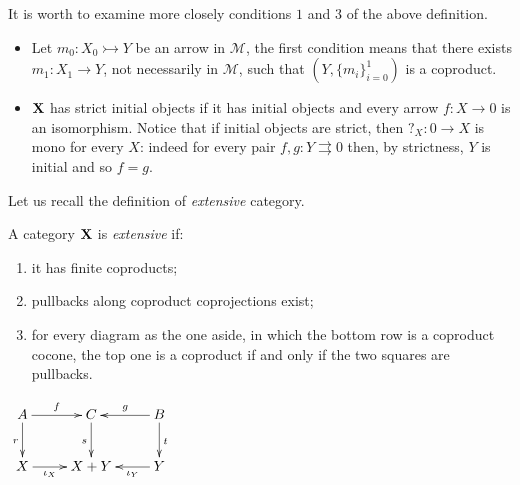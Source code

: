 \documentclass[a4paper,UKenglish,cleveref,pdftex, thm-restate,numberwithinsect]{lipics}
\def\X{\textbf {\textup{X}}}
\begin{document}
\begin{remark}
It is worth to examine more closely conditions $1$ and $3$ of the above definition.
\begin{itemize}
	\item Let $m_0\colon X_0 \rightarrowtail Y$ be an arrow in $\mathcal{M}$, the first condition means that there exists $m_1\colon X_1\to Y$, not necessarily in $\mathcal{M}$, such that $(Y, \{m_i\}_{i=0}^1)$ is a coproduct.
	\item $\X$ has strict initial objects if it has initial objects and every arrow $f:X\to 0$ is an isomorphism. Notice that if initial objects are strict, then $?_X\colon 0\to X$ is mono for every $X$: indeed for every pair $f,g\colon Y\rightrightarrows 0$ then, by strictness, $Y$ is initial and so $f=g$.
\end{itemize} 
\end{remark}

\begin{example}
\end{example}

\begin{example}
\end{example}

Let us recall the definition of \emph{extensive} category.

\noindent
\parbox{10cm}{
\begin{definition}\label{def:ext}
A category $\X$ is \emph{extensive} if:
\begin{enumerate}
	\item it has finite coproducts;
	\item pullbacks along coproduct coprojections exist;
	\item for every diagram as the one aside, in which the bottom row is a coproduct cocone, the top one is a coproduct if and only if the two squares are pullbacks.
\end{enumerate}
\end{definition}}
\parbox{2cm}{$\xymatrix{A\ar[r]^-{f} \ar[d]_{r}& C  \ar[d]_{s}& B \ar[d]^{t}\ar[l]_-{g}\\X  \ar[r]_-{\iota_X}& X+Y & Y \ar[l]^-{\iota_Y}}$}
\end{document}
